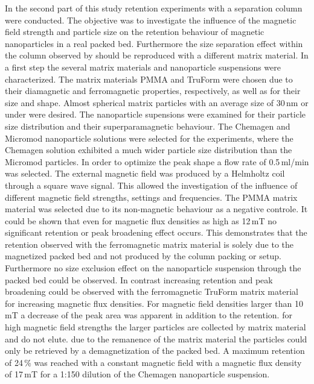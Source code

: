 In the second part of this study retention experiments with a separation column were conducted. The objective was to investigate the influence of the magnetic field strength and particle size on the retention behaviour of magnetic nanoparticles in a real packed bed. Furthermore the size separation effect within the column observed by \cite{AndreMaster} should be reproduced with a different matrix material. 
In a first step the several matrix materials and nanoparticle suspensions were characterized. The matrix materials PMMA and TruForm were chosen due to their diamagnetic and ferromagnetic properties, respectively, as well as for their size and shape. Almost spherical matrix particles with an average size of 30\,nm or under were desired. The nanoparticle supensions were examined for their particle size distribution and their superparamagnetic behaviour. The Chemagen and Micromod nanoparticle solutions were selected for the experiments, where the Chemagen solution exhibited a much wider particle size distribution than the Micromod particles. In order to optimize the peak shape a flow rate of 0.5\,ml/min was selected. The external magnetic field  was produced by a Helmholtz coil through a square wave signal. This allowed the investigation of the influence of different magnetic field strengths, settings and frequencies. The PMMA matrix material was selected due to its non-magnetic behaviour as a negative controle. It could be shown that even for magnetic flux densities as high as 12\,mT no significant retention or peak broadening effect occurs. This demonstrates that the retention observed with the ferromagnetic matrix material is solely due to the magnetized packed bed and not produced by the column packing or setup. Furthermore no size exclusion effect on the nanoparticle suspension through the packed bed could be observed. In contrast increasing retention and peak broadening could be observed with the ferromagnetic TruForm matrix material for increasing magnetic flux densities. For magnetic field densities larger than 10\,mT a decrease of the peak area was apparent in addition to the retention. for high magnetic field strengths the larger particles are collected by matrix material and do not elute. due to the remanence of the matrix material the particles could only be retrieved by a demagnetization of the packed bed. A maximum retention of 24\,\% was reached with a  constant magnetic field with a magnetic flux density of 17\,mT for a 1:150 dilution of the Chemagen nanoparticle suspension. 

